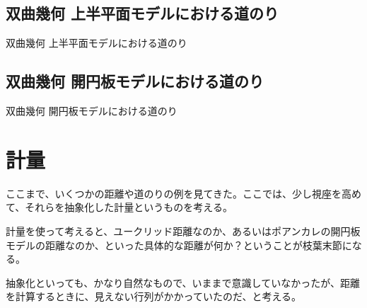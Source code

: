
\subsection{双曲幾何 上半平面モデルにおける道のり}

双曲幾何 上半平面モデルにおける道のり

\newpage


\subsection{双曲幾何 開円板モデルにおける道のり}

双曲幾何 開円板モデルにおける道のり

\newpage


\section{計量}

ここまで、いくつかの距離や道のりの例を見てきた。ここでは、少し視座を高めて、それらを抽象化した計量というものを考える。

計量を使って考えると、ユークリッド距離なのか、あるいはポアンカレの開円板モデルの距離なのか、といった具体的な距離が何か？ということが枝葉末節になる。

抽象化といっても、かなり自然なもので、いままで意識していなかったが、距離を計算するときに、見えない行列がかかっていたのだ、と考える。

\newpage
